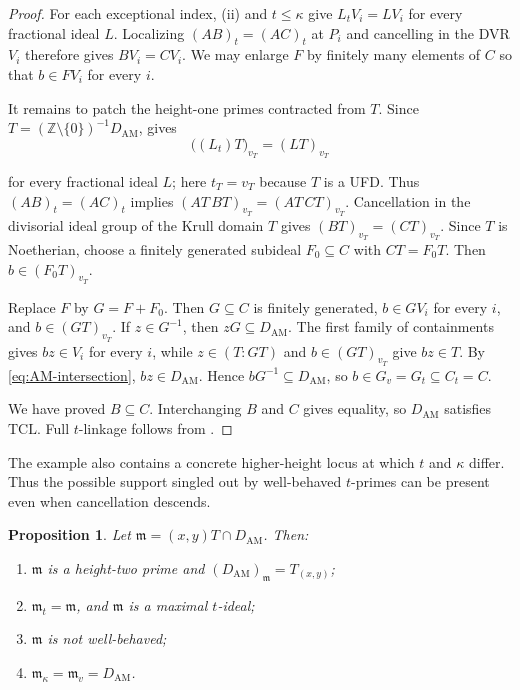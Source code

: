 \documentclass[11pt]{amsart}
\newtheorem{proposition}[proposition]{Proposition}
\theoremstyle{definition}
\theoremstyle{remark}
\newcommand{\TCL}{\mathrm{TCL}}
\begin{document}
\begin{proof}
For each exceptional index, (ii) and
$t\leq\kappa$ give $L_tV_i=LV_i$ for every fractional ideal $L$.  Localizing
$(AB)_t=(AC)_t$ at $P_i$ and cancelling in the DVR $V_i$ therefore gives
$BV_i=CV_i$.  We may enlarge $F$ by finitely many elements of $C$ so that
$b\in FV_i$ for every $i$.

It remains to patch the height-one primes contracted from $T$.  Since
$T=(\mathbb Z\setminus\{0\})^{-1}D_{\mathrm{AM}}$,
 gives
\begin{equation}\label{eq:AM-T-localization}
 \bigl((L_t)T\bigr)_{v_T}=(LT)_{v_T}
\end{equation}

for every fractional ideal $L$; here $t_T=v_T$ because $T$ is a UFD.  Thus
$(AB)_t=(AC)_t$ implies
$(AT\,BT)_{v_T}=(AT\,CT)_{v_T}$.  Cancellation in the divisorial ideal
group of the Krull domain $T$ gives $(BT)_{v_T}=(CT)_{v_T}$.  Since $T$ is
Noetherian, choose a finitely generated subideal $F_0\subseteq C$ with
$CT=F_0T$.  Then $b\in(F_0T)_{v_T}$.

Replace $F$ by $G=F+F_0$.  Then $G\subseteq C$ is finitely generated,
$b\in GV_i$ for every $i$, and $b\in(GT)_{v_T}$.  If $z\in G^{-1}$, then
$zG\subseteq D_{\mathrm{AM}}$.  The first family of containments gives
$bz\in V_i$ for every $i$, while
$z\in(T:GT)$ and $b\in(GT)_{v_T}$ give $bz\in T$.  By
\eqref{eq:AM-intersection}, $bz\in D_{\mathrm{AM}}$.  Hence
$bG^{-1}\subseteq D_{\mathrm{AM}}$, so
$b\in G_v=G_t\subseteq C_t=C$.

We have proved $B\subseteq C$.  Interchanging $B$ and $C$ gives equality,
so $D_{\mathrm{AM}}$ satisfies $\TCL$.  Full $t$-linkage follows from
.
\end{proof}

The example also contains a concrete higher-height locus at which $t$ and
$\kappa$ differ.  Thus the possible support singled out by well-behaved
$t$-primes can be present even when cancellation descends.

\begin{proposition}\label{prop:AM-defect}
Let
$\mathfrak m=(x,y)T\cap D_{\mathrm{AM}}$.  Then:
\begin{enumerate}[label=\textup{(\roman*)}]
\item $\mathfrak m$ is a height-two prime and
      $(D_{\mathrm{AM}})_{\mathfrak m}=T_{(x,y)}$;
\item $\mathfrak m_t=\mathfrak m$, and $\mathfrak m$ is a maximal $t$-ideal;
\item $\mathfrak m$ is not well-behaved;
\item $\mathfrak m_\kappa=\mathfrak m_v=D_{\mathrm{AM}}$.
\end{enumerate}
\end{proposition}
\end{document}
